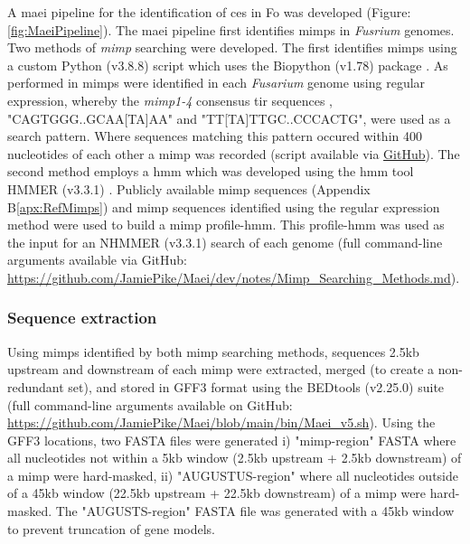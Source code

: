 A \acf{maei} pipeline for the identification of \acp{ce} in \ac{Fo} was developed (Figure: \ref{fig:MaeiPipeline}). The \ac{maei} pipeline first identifies \acp{mimp} in \textit{Fusrium} genomes. Two methods of \textit{mimp} searching were developed. The first identifies \acp{mimp} using a custom Python (v3.8.8) script \parencite{Python} which uses the Biopython (v1.78) package \parencite{biopython}. As performed in \textcite{Schmidt2013, Dam2016, Armitage2018} \acp{mimp} were identified in each \textit{Fusarium} genome using regular expression, whereby the \textit{mimp1-4} consensus \ac{tir} sequences \parencite{Bergemann2008, Schmidt2013}, "CAGTGGG..GCAA[TA]AA" and "TT[TA]TTGC..CCCACTG", were used as a search pattern. Where sequences matching this pattern occured within 400 nucleotides of each other a \ac{mimp} was recorded (script available via \href{https://github.com/JamiePike/Maei/blob/main/bin/Mimp_finditer.py}{GitHub}). The second method employs a \acf{hmm} which was developed using the \ac{hmm} tool HMMER (v3.3.1) \parencite{Eddy2011}. Publicly available \ac{mimp} sequences (Appendix B\ref{apx:RefMimps}) and \ac{mimp} sequences identified using the regular expression method were used to build a \ac{mimp} profile-\ac{hmm}. This profile-\ac{hmm} was used as the input for an NHMMER (v3.3.1) \parencite{Eddy2011} search of each genome (full command-line arguments available via GitHub: \href{https://github.com/JamiePike/Maei/blob/main/dev/notes/Mimp_Searching_Methods.md}{https://github.com/JamiePike/Maei/dev/notes/Mimp\_Searching\_Methods.md}).

\subsubsection{Sequence extraction}

Using \acp{mimp} identified by both \ac{mimp} searching methods, sequences 2.5kb upstream and downstream of each \ac{mimp} were extracted, merged (to create a non-redundant set), and stored in GFF3 format using the BEDtools (v2.25.0) suite \parencite{Quinlan2010} (full command-line arguments available on GitHub: \href{https://github.com/JamiePike/Maei/blob/main/bin/Maei_v5.sh}{https://github.com/JamiePike/Maei/bl\-ob/main/bin/Maei\_v5.sh}). Using the GFF3 locations, two FASTA files were generated i) "\ac{mimp}-region" FASTA where all nucleotides not within a 5kb window (2.5kb upstream + 2.5kb downstream) of a \ac{mimp} were hard-masked, ii) "AUGUSTUS-region" where all nucleotides outside of a 45kb window (22.5kb upstream + 22.5kb downstream) of a \ac{mimp} were hard-masked. The "AUGUSTS-region" FASTA file was generated with a 45kb window to prevent truncation of gene models. 

